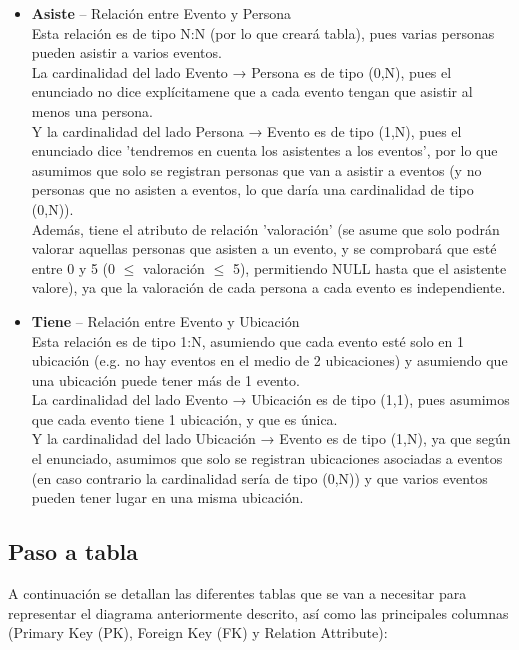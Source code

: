 \documentclass[12pt]{article}
\begin{document}
\begin{itemize}
        \item \textbf{Asiste} -- Relación entre Evento y Persona\\
            Esta relación es de tipo N:N (por lo que creará tabla), pues varias personas pueden asistir a varios eventos. \\
            La cardinalidad del lado Evento → Persona es de tipo (0,N), pues el enunciado no dice explícitamene que a cada evento tengan que asistir al menos
            una persona. \\
            Y la cardinalidad del lado Persona → Evento es de tipo (1,N), pues el enunciado dice 'tendremos en cuenta los asistentes a los eventos', 
            por lo que asumimos que solo se registran personas que van a asistir a eventos (y no personas que no asisten a eventos, lo que daría una cardinalidad
            de tipo (0,N)). \\
            Además, tiene el atributo de relación 'valoración' (se asume que solo podrán valorar aquellas personas que asisten a un evento, 
            y se comprobará que esté entre 0 y 5 (0 $\leq$ valoración $\leq$ 5), permitiendo NULL hasta que el asistente valore), ya que la valoración 
            de cada persona a cada evento es independiente.
                
        \item \textbf{Tiene} -- Relación entre Evento y Ubicación\\
            Esta relación es de tipo 1:N, asumiendo que cada evento esté solo en 1 ubicación (e.g. no hay eventos en el medio de 2 ubicaciones)
            y asumiendo que una ubicación puede tener más de 1 evento. \\
            La cardinalidad del lado Evento → Ubicación es de tipo (1,1), pues asumimos que cada evento tiene 1 ubicación, y que es única. \\
            Y la cardinalidad del lado Ubicación → Evento es de tipo (1,N), ya que según el enunciado, asumimos que solo se registran ubicaciones asociadas 
            a eventos (en caso contrario la cardinalidad sería de tipo (0,N)) y que varios eventos pueden tener lugar en una misma ubicación.

    \end{itemize}

    \newpage
    \subsection{Paso a tabla}
    A continuación se detallan las diferentes tablas que se van a necesitar para representar el diagrama anteriormente descrito, así como las principales columnas 
    (Primary Key (PK), Foreign Key (FK) y Relation Attribute):
\end{document}
